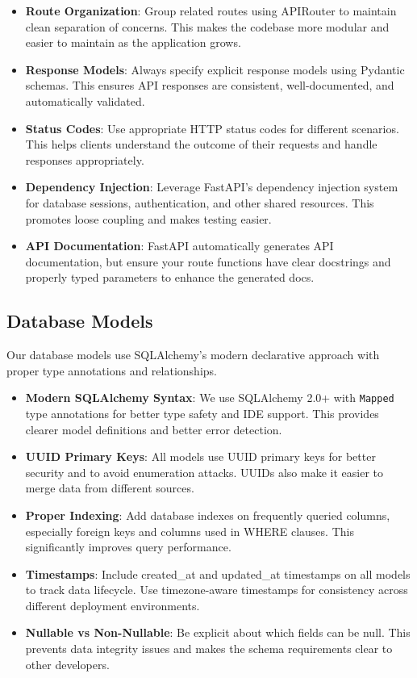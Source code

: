 \documentclass[12pt]{article}
\begin{document}
\begin{itemize}
    \item \textbf{Route Organization}: Group related routes using APIRouter to maintain clean separation of concerns. This makes the codebase more modular and easier to maintain as the application grows.
    
    \item \textbf{Response Models}: Always specify explicit response models using Pydantic schemas. This ensures API responses are consistent, well-documented, and automatically validated.
    
    \item \textbf{Status Codes}: Use appropriate HTTP status codes for different scenarios. This helps clients understand the outcome of their requests and handle responses appropriately.
    
    \item \textbf{Dependency Injection}: Leverage FastAPI's dependency injection system for database sessions, authentication, and other shared resources. This promotes loose coupling and makes testing easier.
    
    \item \textbf{API Documentation}: FastAPI automatically generates API documentation, but ensure your route functions have clear docstrings and properly typed parameters to enhance the generated docs.
\end{itemize}

\subsection{Database Models}
Our database models use SQLAlchemy's modern declarative approach with proper type annotations and relationships.

\begin{itemize}
    \item \textbf{Modern SQLAlchemy Syntax}: We use SQLAlchemy 2.0+ with \texttt{Mapped} type annotations for better type safety and IDE support. This provides clearer model definitions and better error detection.
    
    \item \textbf{UUID Primary Keys}: All models use UUID primary keys for better security and to avoid enumeration attacks. UUIDs also make it easier to merge data from different sources.
    
    \item \textbf{Proper Indexing}: Add database indexes on frequently queried columns, especially foreign keys and columns used in WHERE clauses. This significantly improves query performance.
    
    \item \textbf{Timestamps}: Include created\_at and updated\_at timestamps on all models to track data lifecycle. Use timezone-aware timestamps for consistency across different deployment environments.
    
    \item \textbf{Nullable vs Non-Nullable}: Be explicit about which fields can be null. This prevents data integrity issues and makes the schema requirements clear to other developers.
\end{itemize}
\end{document}
